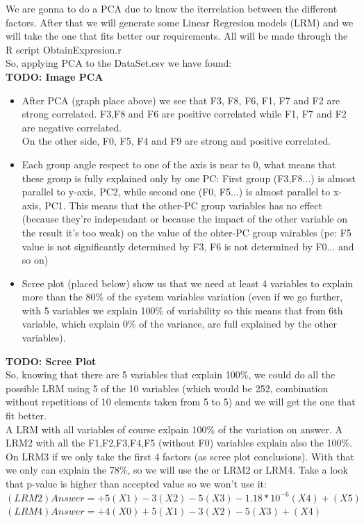 \documentclass[12pt]{article}
\begin{document}
We are gonna to do a PCA due to know the iterrelation between the different factors. After that we will generate some Linear Regresion models (LRM) and we will take the one that fits better our requirements. All will be made through the R script ObtainExpresion.r\\
So, applying PCA to the DataSet.csv we have found:\\
\textbf{TODO: Image PCA}
\begin{itemize}
\item After PCA (graph place above) we see that F3, F8, F6, F1, F7 and F2 are strong correlated. F3,F8 and F6 are positive correlated while F1, F7 and F2 are negative correlated.\\ On the other side, F0, F5, F4 and F9 are strong and positive correlated.
\item Each group angle respect to one of the axis is near to 0, what means that these group is fully explained only by one PC: First group (F3,F8...) is almost parallel to y-axis, PC2, while second one (F0, F5...) is almost parallel to x-axis, PC1. 
This means that the other-PC group variables has no effect (because they're independant or because the impact of the other variable on the result it's too weak) on the value of the ohter-PC group vairables (pe: F5 value is not significantly determined by F3, F6 is not determined by F0... and so on)
\item Scree plot (placed below) show us that we need at least 4 variables to explain more than the 80\% of the system variables variation (even if we go further, with 5 variables we explain 100\% of variability so this means that from 6th variable, which explain 0\% of the variance, are full explained by the other variables).
\end{itemize}
\textbf{TODO: Scree Plot}
\\
So, knowing that there are 5 variables that explain 100\%, we could do all the possible LRM using 5 of the 10 variables (which would be 252, combination without repetitions of 10 elements taken from 5 to 5) and we will get the one that fit better. \\

A LRM with all variables of course exlpain 100\% of the variation on answer.
A LRM2 with all the F1,F2,F3,F4,F5 (without F0) variables explain also the 100\%.
On LRM3 if we only take the first 4 factors (as scree plot conclusions). With that we only can explain the 78\%, so we will use the or LRM2 or LRM4. Take a look that p-value is higher than accepted value so we won't use it:\\
$(LRM2) Answer = +5(X1)-3(X2)-5(X3)-1.18*10^{-6}(X4)+(X5)$\\
$(LRM4) Answer = +4(X0)+5(X1)-3(X2)-5(X3)+(X4)$\\
\end{document}
